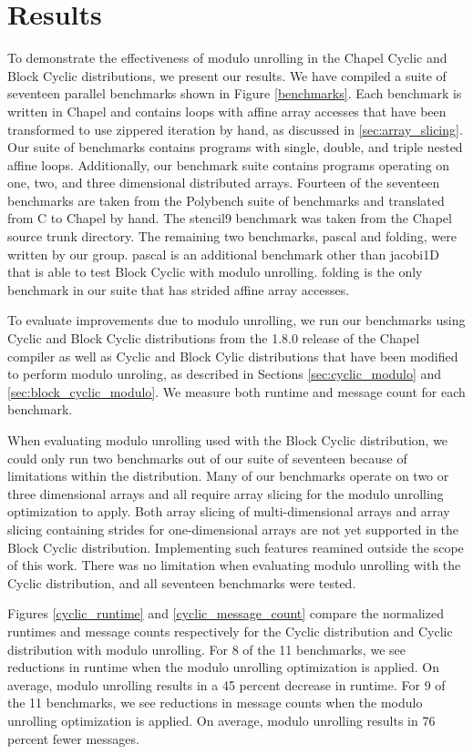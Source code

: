 \section{Results}\label{sec:results}

To demonstrate the effectiveness of modulo unrolling in the Chapel Cyclic and Block Cyclic distributions, we present our results. We have compiled a suite of seventeen parallel benchmarks shown in Figure \ref{benchmarks}. Each benchmark is written in Chapel and contains loops with affine array accesses that have been transformed to use zippered iteration by hand, as discussed in \ref{sec:array_slicing}. Our suite of benchmarks contains programs with single, double, and triple nested affine loops. Additionally, our benchmark suite contains programs operating on one, two, and three dimensional distributed arrays. Fourteen of the seventeen benchmarks are taken from the Polybench suite of benchmarks and translated from C to Chapel by hand. The stencil9 benchmark was taken from the Chapel source trunk directory. The remaining two benchmarks, pascal and folding, were written by our group. pascal is an additional benchmark other than jacobi1D that is able to test Block Cyclic with modulo unrolling. folding is the only benchmark in our suite that has strided affine array accesses. 

To evaluate improvements due to modulo unrolling, we run our benchmarks using Cyclic and Block Cyclic distributions from the 1.8.0 release of the Chapel compiler as well as Cyclic and Block Cylic distributions that have been modified to perform modulo unroling, as described in Sections \ref{sec:cyclic_modulo} and \ref{sec:block_cyclic_modulo}. We measure both runtime and message count for each benchmark. 

When evaluating modulo unrolling used with the Block Cyclic distribution, we could only run two benchmarks out of our suite of seventeen because of limitations within the distribution. Many of our benchmarks operate on two or three dimensional arrays and all require array slicing for the modulo unrolling optimization to apply. Both array slicing of multi-dimensional arrays and array slicing containing strides for one-dimensional arrays are not yet supported in the Block Cyclic distribution. Implementing such features reamined outside the scope of this work. There was no limitation when evaluating modulo unrolling with the Cyclic distribution, and all seventeen benchmarks were tested.

Figures \ref{cyclic_runtime} and \ref{cyclic_message_count} compare the normalized runtimes and message counts respectively for the Cyclic distribution and Cyclic distribution with modulo unrolling. For 8 of the 11 benchmarks, we see reductions in runtime when the modulo unrolling optimization is applied. On average, modulo unrolling results in a 45 percent decrease in runtime. For 9 of the 11 benchmarks, we see reductions in message counts when the modulo unrolling optimization is applied. On average, modulo unrolling results in 76 percent fewer messages. 

